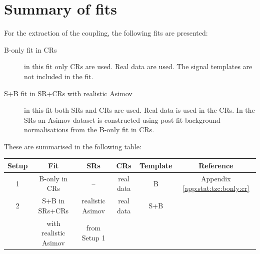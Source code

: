 \section{Summary of fits}
\label{sec:stat:summary}
For the extraction of the \tZc coupling, the following fits
are presented:
\begin{description}
	\item[B-only fit in CRs] in this fit only CRs are used. Real data are
	used. The signal templates are not included in the fit. 
	\item[S+B fit in SR+CRs with realistic Asimov] in this fit both SRs and CRs are used. Real
	data is used in the CRs. In the SRs an Asimov dataset is constructed
	using post-fit background normalisations from the B-only fit in CRs.  
\end{description}
These are summarised in the following table:

\begin{table}[htbp]
	\small
	\centering
	\begin{tabular}{cccccc}
		\toprule
		Setup & Fit & SRs & CRs & Template & Reference \\
		\midrule
		1 & B-only in CRs & -- & real data & B  & Appendix \ref{app:stat:tzc:bonly:cr} \\
		\midrule
		2 & S+B in SRs+CRs & realistic Asimov & real data & S+B  & \Cref{sec:stat:tzc:splusb:crsr} \\
		& with realistic Asimov & from Setup 1 & & & \\
		\bottomrule
	\end{tabular}
\end{table}


